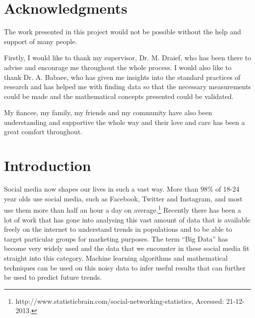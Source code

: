 \documentclass[11pt,a4paper]{article}
\begin{document}
\clearpage
\section*{\center Acknowledgments}
The work presented in this project would not be possible without the help and support of many people. 

Firstly, I would like to thank my supervisor, Dr. M. Draief, who has been there to advise and encourage me throughout the whole process. I would also like to thank Dr. A. Babaee, who has given me insights into the standard practices of research and has helped me with finding data so that the necessary measurements could be made and the mathematical concepts presented could be validated. 

My fiancee, my family, my friends and my community have also been understanding and supportive the whole way and their love and care has been a great comfort throughout.
\clearpage
\tableofcontents
\newpage
{}

\section{Introduction}
Social media now shapes our lives in such a vast way. More than $98\%$ of 18-24 year olds use social media, such as Facebook, Twitter and Instagram, and most use them more than half an hour a day on average.\footnote{http://www.statisticbrain.com/social-networking-statistics, Accessed: 21-12-2013.} Recently there has been a lot of work that has gone into analysing this vast amount of data that is available freely on the internet to understand trends in populations and to be able to target particular groups for marketing purposes. The term ``Big Data'' has become very widely used and the data that we encounter in these social media fit straight into this category. Machine learning algorithms and mathematical techniques can be used on this noisy data to infer useful results that can further be used to predict future trends. 
\end{document}

